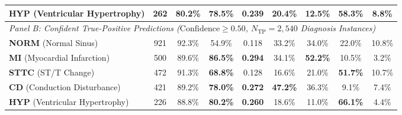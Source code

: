 \documentclass[5p,twocolumn,10pt]{elsarticle}
\begin{document}
\begin{table}[t]
{\begin{tabular}{lcccccccc}
\textbf{HYP} (Ventricular Hypertrophy) & 262 & 80.2\% & \textbf{78.5\%} & \textbf{0.239} & 20.4\% & 12.5\% & \textbf{58.3\%} & 8.8\% \\
\midrule
\multicolumn{9}{l}{\textit{Panel B: Confident True-Positive Predictions ($\text{Confidence} \ge 0.50$, $N_{\text{TP}} = 2,540$ Diagnosis Instances)}} \\
\midrule
\textbf{NORM} (Normal Sinus) & 921 & 92.3\% & 54.9\% & 0.118 & 33.2\% & 34.0\% & 22.0\% & 10.8\% \\
\textbf{MI} (Myocardial Infarction) & 500 & 89.6\% & \textbf{86.5\%} & \textbf{0.294} & 34.1\% & \textbf{52.2\%} & 10.5\% & 3.2\% \\
\textbf{STTC} (ST/T Change) & 472 & 91.3\% & \textbf{68.8\%} & 0.128 & 16.6\% & 21.0\% & \textbf{51.7\%} & 10.7\% \\
\textbf{CD} (Conduction Disturbance) & 421 & 89.2\% & \textbf{78.0\%} & \textbf{0.272} & \textbf{47.2\%} & 36.3\% & 9.1\% & 7.4\% \\
\textbf{HYP} (Ventricular Hypertrophy) & 226 & 88.8\% & \textbf{80.2\%} & \textbf{0.260} & 18.6\% & 11.0\% & \textbf{66.1\%} & 4.4\% \\
\bottomrule
\end{tabular}%
}
\end{table}
\end{document}
